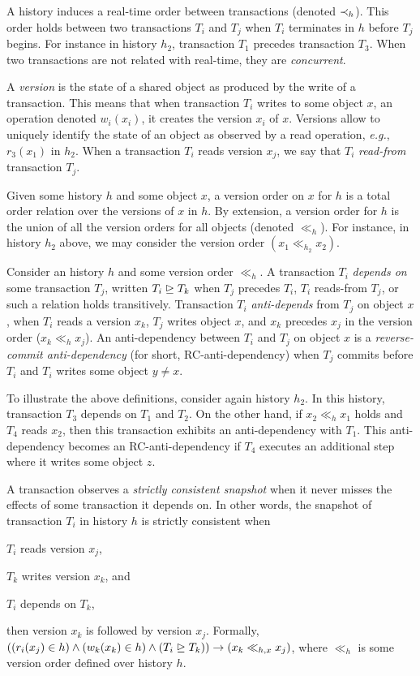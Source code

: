 A history induces a real-time order between transactions (denoted $\hb_h$).
This order holds between two transactions $T_i$ and $T_j$ when $T_i$ terminates in $h$ before $T_j$ begins.
For instance in history $h_2$, transaction $T_1$ precedes transaction $T_3$.
When two transactions are not related with real-time, they are \emph{concurrent}.

A \emph{version} is the state of a shared object as produced by the write of a transaction.
This means that when transaction $T_i$ writes to some object $x$, an operation denoted $w_i(x_i)$, it creates the version $x_i$ of $x$.
Versions allow to uniquely identify the state of an object as observed by a read operation, \emph{e.g.}, $r_3(x_1)$ in $h_2$.
When a transaction $T_i$ reads version $x_j$, we say that $T_i$ \emph{read-from} transaction $T_j$.

Given some history $h$ and some object $x$, a version order on $x$ for $h$ is a total order relation over the versions of $x$ in $h$.
By extension, a version order for $h$ is the union of all the version orders for all objects (denoted $\ll_h$).
For instance, in history $h_2$ above, we may consider the version order $(x_1 \ll_{h_2} x_2)$.

Consider an history $h$ and some version order $\ll_h$.
A transaction $T_i$ \emph{depends on} some transaction $T_j$, written $T_i \mathrel{\unrhd} T_k$ when $T_j$ precedes $T_i$, $T_i$ reads-from $T_j$, or such a relation holds transitively.
Transaction $T_i$ \emph{anti-depends} from $T_j$ on object $x$, when $T_i$ reads a version $x_k$, $T_j$ writes object $x$, and $x_k$ precedes $x_j$ in the version order ($x_k \ll_{h} x_j$).
An anti-dependency between $T_i$ and $T_j$ on object $x$ is a \emph{reverse-commit anti-dependency} (for short, RC-anti-dependency) \cite{hans16} when $T_j$ commits before $T_i$ and $T_i$ writes some object $y \neq x$.

To illustrate the above definitions, consider again history $h_2$.
In this history, transaction $T_3$ depends on $T_1$ and $T_2$.
On the other hand, if $x_2 \ll_h x_1$ holds and $T_4$ reads $x_2$, then this transaction exhibits an anti-dependency with $T_1$.
This anti-dependency becomes an RC-anti-dependency if $T_4$ executes an additional step where it writes some object $z$.

A transaction observes a \emph{strictly consistent snapshot} \cite{berstein?} when it never misses the effects of some transaction it depends on.
In other words, the snapshot of transaction $T_i$ in history $h$ is strictly consistent when
\begin{inparaenum}
\item $T_i$ reads version $x_j$,
\item $T_k$ writes version $x_k$, and 
\item $T_i$ depends on $T_{k}$,
\end{inparaenum}
then version $x_k$ is followed by version $x_j$.
Formally, $((r_i(x_j) \in h) \land (w_k(x_k) \in h) \land (T_i \depends T_k)) \implies (x_k \ll_{h,x} x_j)$, where $\ll_{h}$ is some version order defined over history $h$.

